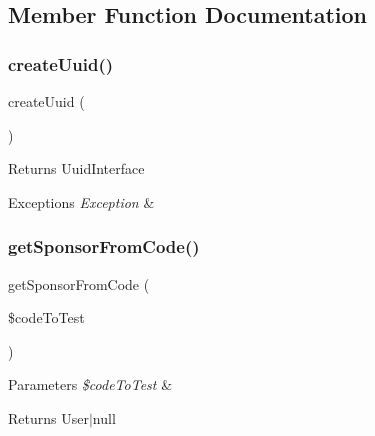 \subsection{Member Function Documentation}
\mbox{\label{class_app_1_1_b_l_1_1_uuid_service_a12685af7484cfb070938200155d0c745}} 
\subsubsection{\texorpdfstring{createUuid()}{createUuid()}}
{\footnotesize\ttfamily create\+Uuid (\begin{DoxyParamCaption}{ }\end{DoxyParamCaption})}

\begin{DoxyReturn}{Returns}
Uuid\+Interface 
\end{DoxyReturn}

\begin{DoxyExceptions}{Exceptions}
{\em Exception} & \\
\hline
\end{DoxyExceptions}
\mbox{\label{class_app_1_1_b_l_1_1_uuid_service_a3843abc96055b8ca386f8313b63cb10f}} 
\subsubsection{\texorpdfstring{getSponsorFromCode()}{getSponsorFromCode()}}
{\footnotesize\ttfamily get\+Sponsor\+From\+Code (\begin{DoxyParamCaption}\item[{}]{\$code\+To\+Test }\end{DoxyParamCaption})}


\begin{DoxyParams}{Parameters}
{\em \$code\+To\+Test} & \\
\hline
\end{DoxyParams}
\begin{DoxyReturn}{Returns}
User$\vert$null 
\end{DoxyReturn}
\mbox{\label{class_app_1_1_b_l_1_1_uuid_service_ae47490483beadaa05452afff03805a7e}} 
